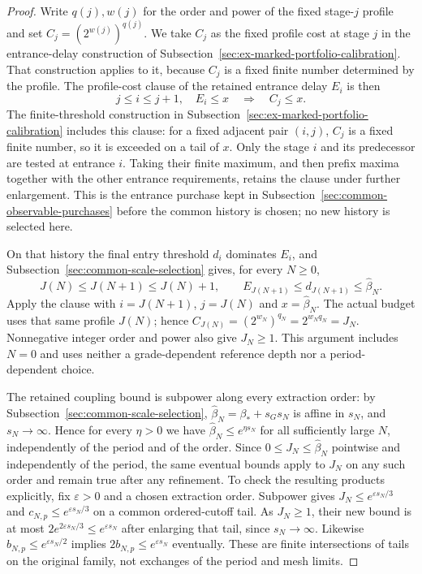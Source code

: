 \begin{proof}
Write $q(j),w(j)$ for the order and power of the fixed stage-$j$
profile and set $C_j=(2^{w(j)})^{q(j)}$. We take $C_j$ as the fixed
profile cost at stage $j$ in the entrance-delay construction of
Subsection~\ref{sec:ex-marked-portfolio-calibration}. That construction
applies to it, because $C_j$ is a fixed finite number determined by the
profile. The profile-cost clause of the retained entrance delay $E_i$ is
then
\[
 j\le i\le j+1,\quad E_i\le x
                  \quad\Longrightarrow\quad C_j\le x.
\]
The finite-threshold construction in
Subsection~\ref{sec:ex-marked-portfolio-calibration} includes this clause:
for a fixed adjacent pair $(i,j)$, $C_j$ is a fixed finite number,
so it is exceeded on a tail of $x$. Only the stage $i$ and its
predecessor are tested at entrance $i$. Taking their finite maximum,
and then prefix maxima together with the other entrance requirements,
retains the clause under further enlargement. This is the entrance
purchase kept in Subsection~\ref{sec:common-observable-purchases} before
the common history is chosen; no new history is selected here.

On that history the final entry threshold $d_i$ dominates $E_i$,
and Subsection~\ref{sec:common-scale-selection} gives, for every $N\ge0$,
\[
 J(N)\le J(N+1)\le J(N)+1,\qquad
 E_{J(N+1)}\le d_{J(N+1)}\le\widehat\beta_N.
\]
Apply the clause with $i=J(N+1)$, $j=J(N)$ and
$x=\widehat\beta_N$. The actual budget uses that same profile $J(N)$;
hence $C_{J(N)}=(2^{w_N})^{q_N}=2^{w_Nq_N}=J_N$.
Nonnegative integer order and power also give $J_N\ge1$.
This argument includes $N=0$ and uses neither a grade-dependent
reference depth nor a period-dependent choice.

The retained coupling bound is subpower along every extraction order:
by Subsection~\ref{sec:common-scale-selection},
$\widehat\beta_N=\beta_*+s_Gs_N$ is affine in $s_N$, and $s_N\to\infty$.
Hence for every $\eta>0$ we have $\widehat\beta_N\le e^{\eta s_N}$ for all
sufficiently large $N$, independently of the period and of the order.
Since $0\le J_N\le\widehat\beta_N$ pointwise and independently of the
period, the same eventual bounds apply to $J_N$ on any such order and
remain true after any refinement. To check the resulting products
explicitly, fix $\varepsilon>0$ and a chosen extraction order.
Subpower gives $J_N\le e^{\varepsilon s_N/3}$ and
$c_{N,p}\le e^{\varepsilon s_N/3}$ on a common ordered-cutoff tail.
As $J_N\ge1$, their new bound is at most
$2e^{2\varepsilon s_N/3}\le e^{\varepsilon s_N}$ after enlarging
that tail, since $s_N\to\infty$. Likewise
$b_{N,p}\le e^{\varepsilon s_N/2}$ implies
$2b_{N,p}\le e^{\varepsilon s_N}$ eventually. These are finite
intersections of tails on the original family, not exchanges of the
period and mesh limits.
\end{proof}

